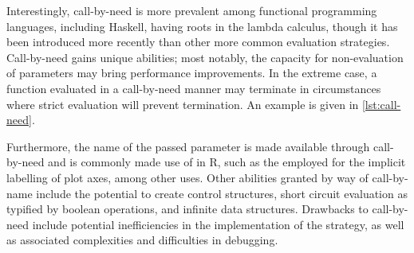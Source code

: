 Interestingly, call-by-need is more prevalent among functional programming languages, including Haskell, having roots in the lambda calculus, though it has been introduced more recently than other more common evaluation strategies\cite{nita2017haskell}.
Call-by-need gains unique abilities; most notably, the capacity for non-evaluation of parameters may bring performance improvements.
In the extreme case, a function evaluated in a call-by-need manner may terminate in circumstances where strict evaluation will prevent termination.
An example is given in \cref{lst:call-need}.


Furthermore, the name of the passed parameter is made available through call-by-need and is commonly made use of in R, such as the  employed for the implicit labelling of plot axes, among other uses.
Other abilities granted by way of call-by-name include the potential to create control structures, short circuit evaluation as typified by boolean operations, and infinite data structures.
Drawbacks to call-by-need include potential inefficiencies in the implementation of the strategy, as well as associated complexities and difficulties in debugging\cite{nilsson1999lazydebug}.

